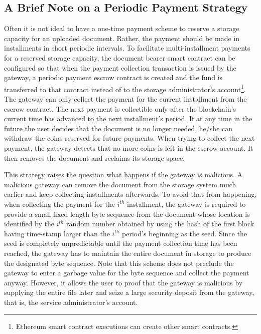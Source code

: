 \subsection{A Brief Note on a Periodic Payment Strategy}
Often it is not ideal to have a one-time payment scheme to reserve a storage capacity for an uploaded document. Rather, the payment should be made in installments in short periodic intervals. To facilitate multi-installment payments for a reserved storage capacity, the document bearer smart contract can be configured so that when the payment collection transaction is issued by the gateway, a periodic payment escrow contract is created and the fund is transferred to that contract instead of to the storage administrator's account\footnote{Ethereum smart contract executions can create other smart contracts.}. The gateway can only collect the payment for the current installment from the escrow contract. The next payment is collectible only after the blockchain's current time has advanced to the next installment's period. If at any time in the future the user decides that the document is no longer needed, he/she can withdraw the coins reserved for future payments. When trying to collect the next payment, the gateway detects that no more coins is left in the escrow account. It then removes the document and reclaims its storage space.

This strategy raises the question what happens if the gateway is malicious. A malicious gateway can remove the document from the storage system much earlier and keep collecting installments afterwards. To avoid that from happening, when collecting the payment for the $i^{th}$ installment, the gateway is required to provide a small fixed length byte sequence from the document whose location is identified by the $i^{th}$ random number obtained by using the hash of the first block having time-stamp larger than the $i^{th}$ period's beginning as the seed. Since the seed is completely unpredictable until the payment collection time has been reached, the gateway has to maintain the entire document in storage to produce the designated byte sequence. Note that this scheme does not preclude the gateway to enter a garbage value for the byte sequence and collect the payment anyway. However, it allows the user to proof that the gateway is malicious by supplying the entire file later and seize a large security deposit from the gateway, that is, the service administrator's account.           